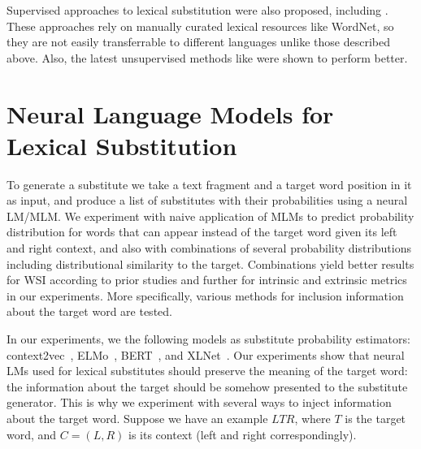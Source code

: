 \documentclass[11pt,a4paper]{article}
\begin{document}
Supervised approaches to lexical substitution were also proposed, including \cite{szarvas-etal-2013-supervised,szarvas-etal-2013-learning,hintz-biemann-2016-language}. These approaches rely on manually curated lexical resources like WordNet, so they are not easily transferrable to different languages unlike those described above. Also, the latest unsupervised methods like \cite{zhou-etal-2019-bert} were shown to perform better. 


\section{Neural Language Models for Lexical Substitution}
\label{sec:methods}

To generate a substitute we take a text fragment and a target word position in it as input, and produce a list of substitutes with their probabilities using a neural LM/MLM. We experiment with naive application of MLMs to predict probability distribution for words that can appear instead of the target word given its left and right context, and also with combinations of several probability distributions including distributional similarity to the target. Combinations yield better results for WSI according to prior studies \cite{amrami-2019,ranlp2019} and further for intrinsic and extrinsic metrics in our experiments. More specifically, various methods for inclusion information about the target word are tested. 

In our experiments, we the following models as substitute probability estimators: context2vec~\cite{c2v}, ELMo~\cite{peters-etal-2018-deep}, BERT~\cite{devlin2018pretraining}, and XLNet~\cite{yang2019xlnet}.
Our experiments show that neural LMs used for lexical substitutes should preserve the meaning of the target word: the information about the target should be somehow presented to the substitute generator. This is why we experiment with several ways to inject information about the target word. Suppose we have an example $LTR$, where $T$ is the target word, and $C = (L, R)$ is its context (left and right correspondingly).
\end{document}
